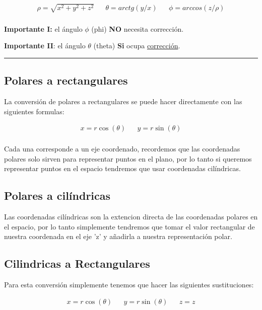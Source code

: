 \documentclass{article}
\begin{document}
\[\begin{aligned}
 \rho = \sqrt{x^2+y^2+z^2} && 
 \theta = arctg\left( y/x \right)  &&
 \phi = arccos\left( z/\rho \right) \\
\end{aligned}\] 

\textbf{Importante I:} el ángulo \(\phi\) (phi) \textbf{NO} necesita corrección.

\textbf{Importante II}: el ángulo \(\theta\) (theta) \textbf{Si} ocupa \hyperref[tab:org93b8981]{corrección}.

\noindent\rule{\textwidth}{0.5pt}

\subsection{Polares a rectangulares}
\label{sec:org968b50e}
La conversión de polares a rectangulares se puede hacer directamente con las siguientes formulas: 

\[\begin{aligned}
 x = r \cos(\theta) && y = r \sin(\theta) \\
\end{aligned}\] 

Cada una corresponde a un eje coordenado, recordemos que las coordenadas polares solo sirven para representar puntos en el plano, por lo tanto si queremos representar puntos en el espacio tendremos que usar coordenadas cilíndricas.

\subsection{Polares a cilíndricas}
\label{sec:org7bc2961}
Las coordenadas cilíndricas son la extencion directa de las coordenadas polares en el espacio, por lo tanto simplemente tendremos que tomar el valor rectangular de nuestra coordenada en el eje 'z' y añadirla a nuestra representación polar.

\subsection{Cilindricas a Rectangulares}
\label{sec:org9300cf2}
Para esta conversión simplemente tenemos que hacer las siguientes sustituciones:

\[\begin{aligned}
 x = r \cos(\theta) && y = r \sin(\theta) && z = z \\
\end{aligned}\] 
\end{document}

